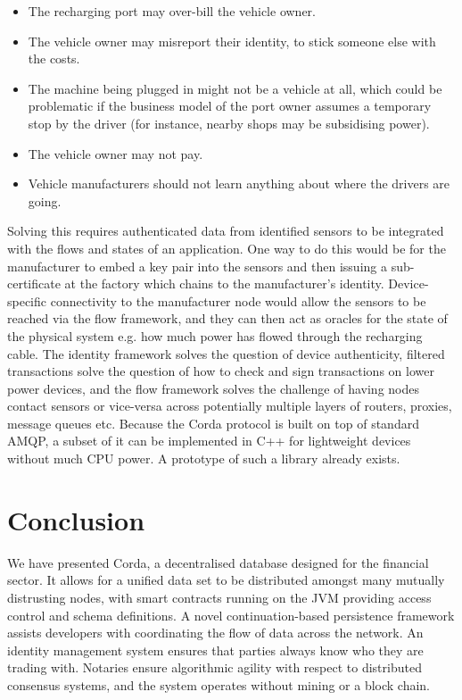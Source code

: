 \documentclass{article}
\begin{document}
\begin{itemize}
    \item The recharging port may over-bill the vehicle owner.
    \item The vehicle owner may misreport their identity, to stick someone else with the costs.
    \item The machine being plugged in might not be a vehicle at all, which could be problematic if the business
          model of the port owner assumes a temporary stop by the driver (for instance, nearby shops may be
          subsidising power).
    \item The vehicle owner may not pay.
    \item Vehicle manufacturers should not learn anything about where the drivers are going.
\end{itemize}

Solving this requires authenticated data from identified sensors to be integrated with the flows and states of an
application. One way to do this would be for the manufacturer to embed a key pair into the sensors and then issuing
a sub-certificate at the factory which chains to the manufacturer's identity. Device-specific connectivity to the
manufacturer node would allow the sensors to be reached via the flow framework, and they can then act as oracles
for the state of the physical system e.g. how much power has flowed through the recharging cable. The identity
framework solves the question of device authenticity, filtered transactions solve the question of how to check and
sign transactions on lower power devices, and the flow framework solves the challenge of having nodes contact
sensors or vice-versa across potentially multiple layers of routers, proxies, message queues etc. Because the Corda
protocol is built on top of standard AMQP, a subset of it can be implemented in C++ for lightweight devices without
much CPU power. A prototype of such a library already exists.

\section{Conclusion}

We have presented Corda, a decentralised database designed for the financial sector. It allows for a unified data
set to be distributed amongst many mutually distrusting nodes, with smart contracts running on the JVM providing
access control and schema definitions. A novel continuation-based persistence framework assists developers with
coordinating the flow of data across the network. An identity management system ensures that parties always know
who they are trading with. Notaries ensure algorithmic agility with respect to distributed consensus systems, and
the system operates without mining or a block chain.
\end{document}
